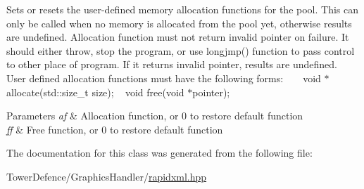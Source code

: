 Sets or resets the user-\/defined memory allocation functions for the pool. This can only be called when no memory is allocated from the pool yet, otherwise results are undefined. Allocation function must not return invalid pointer on failure. It should either throw, stop the program, or use {\ttfamily longjmp()} function to pass control to other place of program. If it returns invalid pointer, results are undefined. ~\newline
~\newline
 User defined allocation functions must have the following forms\+: ~\newline
{\ttfamily  ~\newline
void $\ast$allocate(std\+::size\+\_\+t size); ~\newline
void free(void $\ast$pointer); }~\newline
 
\begin{DoxyParams}{Parameters}
{\em af} & Allocation function, or 0 to restore default function \\
\hline
{\em ff} & Free function, or 0 to restore default function \\
\hline
\end{DoxyParams}


The documentation for this class was generated from the following file\+:\begin{DoxyCompactItemize}
\item 
Tower\+Defence/\+Graphics\+Handler/\mbox{\hyperlink{rapidxml_8hpp}{rapidxml.\+hpp}}\end{DoxyCompactItemize}
